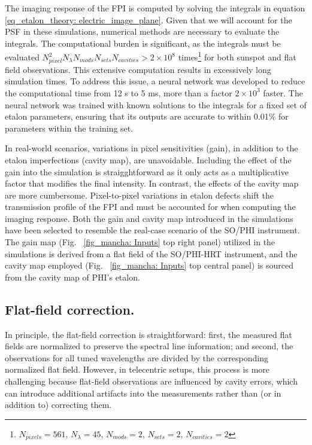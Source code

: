 The imaging response of the FPI is computed by solving the integrals in equation \eqref{eq_etalon_theory: electric_image_plane}. Given that we will account for the PSF in these simulations, numerical methods are necessary to evaluate the integrals. The computational burden is significant, as the integrals must be evaluated $N_{pixel} ^2 N_{\lambda} N_{mods} N_{sets} N_{cavities} > 2\times10 ^8$ times\footnote[2]{$N_{pixels} = 561$, $N_{\lambda} = 45$, $N_{mods} = 2$, $N_{sets} = 2$, $N_{cavities} = 2$} for both sunspot and flat field observations. This extensive computation results in excessively long simulation times. To address this issue, a neural network was developed to reduce the computational time from 12 s to 5 ms, more than a factor $2\times10 ^3$ faster. The neural network was trained with known solutions to the integrals for a fixed set of etalon parameters, ensuring that its outputs are accurate to within 0.01\% for parameters within the training set.

In real-world scenarios, variations in pixel sensitivities (gain), in addition to the etalon imperfections (cavity map), are unavoidable. Including the effect of the gain into the simulation is straigghtforward as it only acts as a multiplicative factor that modifies the final intensity. In contrast, the effects of the cavity map are more cumbersome. Pixel-to-pixel variations in etalon defects shift the transmission profile of the FPI and must be accounted for when computing the imaging response. Both the gain and cavity map introduced in the simulations have been selected to resemble the real-case scenario of the SO/PHI instrument. The gain map (Fig. ~\ref{fig_mancha: Inputs} top right panel) utilized in the simulations is derived from a flat field of the SO/PHI-HRT instrument, and the cavity map employed (Fig. ~\ref{fig_mancha: Inputs} top central panel) is sourced from the cavity map of PHI's etalon.


\subsection{\label{sect: mancha_ff_corr}Flat-field correction.}

In principle, the flat-field correction is straightforward: first, the measured flat fields are normalized to preserve the spectral line information; and second, the observations for all tuned wavelengths are divided by the corresponding normalized flat field. However, in telecentric setups, this process is more challenging because flat-field observations are influenced by cavity errors, which can introduce additional artifacts into the measurements rather than (or in addition to) correcting them.


